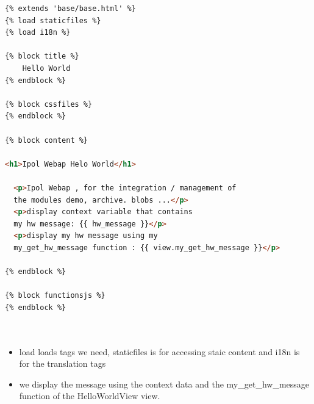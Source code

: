 \begin{lstlisting}[language=html,firstnumber=1]
{% extends 'base/base.html' %}
{% load staticfiles %}
{% load i18n %}

{% block title %}
    Hello World
{% endblock %}

{% block cssfiles %}
{% endblock %}

{% block content %}

<h1>Ipol Webap Helo World</h1>

  <p>Ipol Webap , for the integration / management of 
  the modules demo, archive. blobs ...</p>
  <p>display context variable that contains 
  my hw message: {{ hw_message }}</p>
  <p>display my hw message using my 
  my_get_hw_message function : {{ view.my_get_hw_message }}</p>

{% endblock %}

{% block functionsjs %}
{% endblock %}

		
\end{lstlisting}

\begin{itemize}
\item  load loads tags we need, staticfiles is for accessing staic content and i18n is for the translation tags
\item  we display the message using the context data and the my\_get\_hw\_message function of the HelloWorldView view.

\end{itemize}

